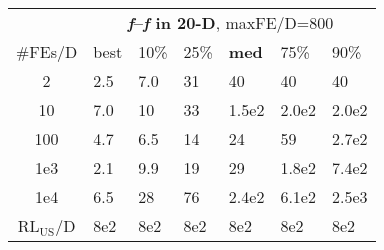 \begin{tabular}{c|llllll}
 & \multicolumn{6}{|c}{\textbf{\textit{f}\raisebox{-0.35ex}{1}--\textit{f}\raisebox{-0.35ex}{24} in 20-D}, maxFE/D=800}\\
\#FEs/D & best & 10\% & 25\% & \textbf{med} & 75\% & 90\%\\
2 & \hspace*{1ex}2.5 & \hspace*{1ex}7.0 & 31 & 40 & 40 & 40\\
10 & \hspace*{1ex}7.0 & 10 & 33 & 1.5e2 & 2.0e2 & 2.0e2\\
100 & \hspace*{1ex}4.7 & \hspace*{1ex}6.5 & 14 & 24 & 59 & 2.7e2\\
1e3 & \hspace*{1ex}2.1 & \hspace*{1ex}9.9 & 19 & 29 & 1.8e2 & 7.4e2\\
1e4 & \hspace*{1ex}6.5 & 28 & 76 & 2.4e2 & 6.1e2 & 2.5e3\\
$\text{RL}_{\text{US}}$/D & 8e2 & 8e2 & 8e2 & 8e2 & 8e2 & 8e2
\end{tabular}
